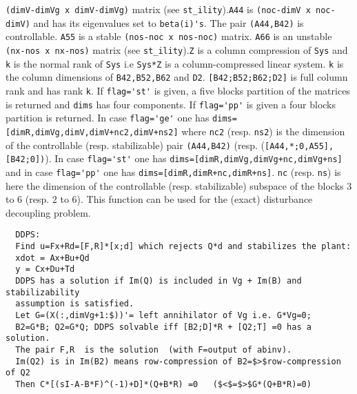 \begin{mandescription}
  \verb!(dimV-dimVg x dimV-dimVg)! matrix (see \verb!st_ility!).\verb!A44! is
  \verb!(noc-dimV x noc-dimV)! and has its eigenvalues set to \verb!beta(i)'s!.
  The pair \verb!(A44,B42)! is controllable.  \verb!A55! is a stable
  \verb!(nos-noc x nos-noc)! matrix.  \verb!A66! is an unstable
  \verb!(nx-nos x nx-nos)! matrix (see \verb!st_ility!).\verb!Z! is a column
  compression of \verb!Sys! and \verb!k! is the normal rank of \verb!Sys! i.e
  \verb!Sys*Z! is a column-compressed linear system. \verb!k! is the column
  dimensions of \verb!B42,B52,B62! and \verb!D2!.  \verb![B42;B52;B62;D2]! is
  full column rank and has rank \verb!k!.  If \verb!flag='st'! is given, a five
  blocks partition of the matrices is returned and \verb!dims! has four
  components. If \verb!flag='pp'! is given a four blocks partition is
  returned. In case \verb!flag='ge'! one has
  \verb!dims=[dimR,dimVg,dimV,dimV+nc2,dimV+ns2]! where \verb!nc2!
  (resp. \verb!ns2!) is the dimension of the controllable (resp.  stabilizable)
  pair \verb!(A44,B42)! (resp. (\verb![A44,*;0,A55],[B42;0])!).  In case
  \verb!flag='st'! one has \verb!dims=[dimR,dimVg,dimVg+nc,dimVg+ns]!  and in
  case \verb!flag='pp'! one has \verb!dims=[dimR,dimR+nc,dimR+ns]!.  \verb!nc!
  (resp. \verb!ns!) is here the dimension of the controllable
  (resp. stabilizable) subspace of the blocks 3 to 6 (resp. 2 to 6).  This
  function can be used for the (exact) disturbance decoupling problem.
\begin{verbatim}
  DDPS:
  Find u=Fx+Rd=[F,R]*[x;d] which rejects Q*d and stabilizes the plant:
  xdot = Ax+Bu+Qd
  y = Cx+Du+Td
  DDPS has a solution if Im(Q) is included in Vg + Im(B) and stabilizability
  assumption is satisfied. 
  Let G=(X(:,dimVg+1:$))'= left annihilator of Vg i.e. G*Vg=0;
  B2=G*B; Q2=G*Q; DDPS solvable iff [B2;D]*R + [Q2;T] =0 has a solution.
  The pair F,R  is the solution  (with F=output of abinv).
  Im(Q2) is in Im(B2) means row-compression of B2=$>$row-compression of Q2
  Then C*[(sI-A-B*F)^(-1)+D]*(Q+B*R) =0   ($<$=$>$G*(Q+B*R)=0)
\end{verbatim}
\end{mandescription}
